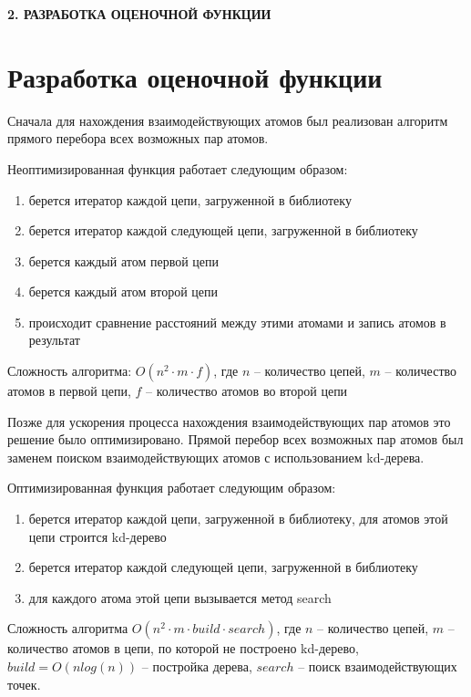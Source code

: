\newpage
\begin{center}
	\textbf{\large 2. РАЗРАБОТКА ОЦЕНОЧНОЙ ФУНКЦИИ}
\end{center}


\section{Разработка оценочной функции}


Сначала для нахождения взаимодействующих атомов был реализован алгоритм прямого перебора всех возможных пар атомов.

Неоптимизированная функция работает следующим образом:

\begin{enumerate}
	\item берется итератор каждой цепи, загруженной в библиотеку
	\item берется итератор каждой следующей цепи, загруженной в библиотеку
	\item берется каждый атом первой цепи
	\item берется каждый атом второй цепи
	\item происходит сравнение расстояний между этими атомами и запись атомов в результат
\end{enumerate} 

Сложность алгоритма: $O(n^2 \cdot m \cdot f)$, где $n$ -- количество цепей, $m$ -- количество атомов в первой цепи, $f$ -- количество атомов во второй цепи

Позже для ускорения процесса нахождения взаимодействующих пар атомов это решение было оптимизировано. Прямой перебор всех возможных пар атомов был заменем поиском взаимодействующих атомов с использованием kd-дерева.

Оптимизированная функция работает следующим образом:

\begin{enumerate}
	\item берется итератор каждой цепи, загруженной в библиотеку, для атомов этой цепи строится kd-дерево
	\item берется итератор каждой следующей цепи, загруженной в библиотеку
	\item для каждого атома этой цепи вызывается метод search
\end{enumerate} 

Сложность алгоритма $O(n^2 \cdot m \cdot build \cdot search)$, где $n$ -- количество цепей, $m$ -- количество атомов в цепи, по которой не построено kd-дерево, $build = O(n log(n))$ -- постройка дерева, $search$ -- поиск взаимодействующих точек.


